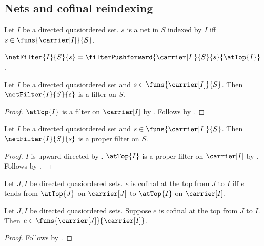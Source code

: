 \subsection{Nets and cofinal reindexing}

\begin{definition}\label{net}
    Let $I$ be a directed quasiordered set.
    $s$ is a net in $S$ indexed by $I$ iff
        $s\in\funs{\carrier[I]}{S}$.
\end{definition}

\begin{definition}\label{net_filter}
    $\netFilter{I}{S}{s}
        =\filterPushforward{\carrier[I]}{S}{s}{\atTop{I}}$.
\end{definition}

\begin{proposition}\label{net_filter_is_filter}
    Let $I$ be a directed quasiordered set and
        $s\in\funs{\carrier[I]}{S}$.
    Then $\netFilter{I}{S}{s}$ is a filter on $S$.
\end{proposition}
\begin{proof}
    $\atTop{I}$ is a filter on $\carrier[I]$ by
        .
    Follows by
        .
\end{proof}

\begin{theorem}\label{net_filter_is_proper}
    Let $I$ be a directed quasiordered set and
        $s\in\funs{\carrier[I]}{S}$.
    Then $\netFilter{I}{S}{s}$ is a proper filter on $S$.
\end{theorem}
\begin{proof}
    $I$ is upward directed by
        .
    $\atTop{I}$ is a proper filter on $\carrier[I]$ by
        .
    Follows by
        .
\end{proof}

\begin{definition}\label{at_top_cofinal}
    Let $J,I$ be directed quasiordered sets.
    $e$ is cofinal at the top from $J$ to $I$ iff
        $e$ tends from $\atTop{J}$ on $\carrier[J]$ to
            $\atTop{I}$ on $\carrier[I]$.
\end{definition}

\begin{proposition}\label{at_top_cofinal_type}
    Let $J,I$ be directed quasiordered sets.
    Suppose $e$ is cofinal at the top from $J$ to $I$.
    Then $e\in\funs{\carrier[J]}{\carrier[I]}$.
\end{proposition}
\begin{proof}
    Follows by .
\end{proof}

